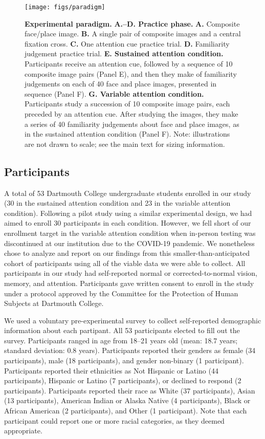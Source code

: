 \documentclass[english]{article}
\begin{document}
\begin{figure*}[tp]
  \centering
  \texttt{[image: figs/paradigm]}

  \caption{\textbf{Experimental paradigm.} \textbf{A.--D. Practice phase.}
  \textbf{A.} Composite face/place image. \textbf{B.} A single pair of
  composite images and a central fixation cross. \textbf{C.} One attention cue
  practice trial. \textbf{D.} Familiarity judgement practice trial. \textbf{E.
  Sustained attention condition.} Participants receive an attention cue,
  followed by a sequence of 10 composite image pairs (Panel E), and then they
  make of familiarity judgements on each of 40 face and place images, presented
  in sequence (Panel F). \textbf{G. Variable attention condition.} Participants
  study a succession of 10 composite image pairs, each preceded by an attention
  cue. After studying the images, they make a series of 40 familiarity
  judgements about face and place images, as in the sustained attention
  condition (Panel F). Note: illustrations are not drawn to scale; see the main
  text for sizing information.}

\label{fig:paradigm}
\end{figure*}

\subsection*{Participants} 

A total of 53 Dartmouth College undergraduate students enrolled in our study
(30 in the sustained attention condition and 23 in the variable attention
condition). Following a pilot study using a similar experimental design, we
had aimed to enroll 30 participants in each condition. However, we fell short of
our enrollment target in the variable attention condition when in-person
testing was discontinued at our institution due to the COVID-19 pandemic. We
nonetheless chose to analyze and report on our findings from this
smaller-than-anticipated cohort of participants using all of the viable data we
were able to collect. All participants in our study had self-reported normal or
corrected-to-normal vision, memory, and attention. Participants gave written
consent to enroll in the study under a protocol approved by the Committee for
the Protection of Human Subjects at Dartmouth College.

We used a voluntary pre-experimental survey to collect self-reported
demographic information about each partipant. All 53 participants elected to
fill out the survey. Participants ranged in age from 18--21 years old (mean:
18.7 years; standard deviation: 0.8 years). Participants reported their genders
as female (34 participants), male (18 participants), and gender non-binary (1
participant). Participants reported their ethnicities as Not Hispanic or Latino
(44 participants), Hispanic or Latino (7 participants), or declined to respond
(2 participants). Participants reported their race as White (37 participants),
Asian (13 participants), American Indian or Alaska Native (4 participants),
Black or African American (2 participants), and Other (1 participant). Note
that each participant could report one or more racial categories, as they
deemed appropriate. 
\end{document}
